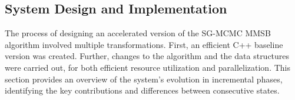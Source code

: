 \subsection{System Design and Implementation}

The process of designing an accelerated version of the SG-MCMC MMSB algorithm
involved multiple transformations. First, an efficient C++ baseline version
was created. Further, changes to the algorithm and the data structures
were carried out, for both efficient resource utilization and parallelization.
This section provides an overview of the system's evolution in incremental
phases, identifying the key contributions and differences between consecutive
states.




